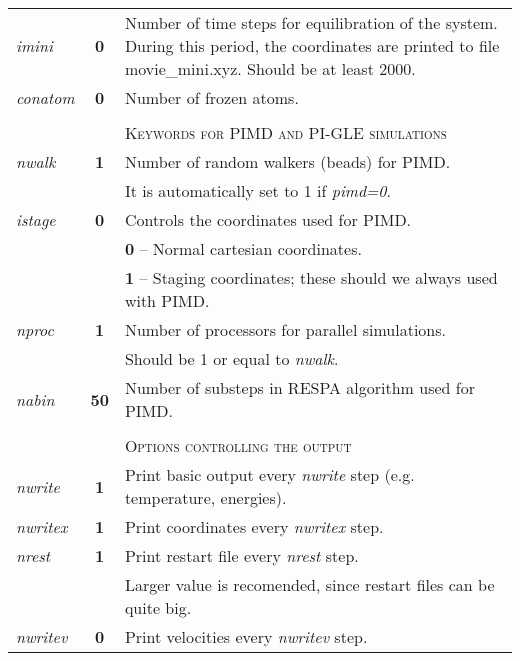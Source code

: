 \documentclass[12pt,a4paper]{article}
\begin{document}
\begin{tabular}{lcl}
\textit{imini} & \textbf{0} &  Number of time steps for equilibration of the system. 
During this period, the coordinates are printed to file movie\_mini.xyz. Should be at least 2000. \\

\textit{conatom} & \textbf{0} & Number of frozen atoms. \\ 
& & \\
& & \textsc{Keywords for PIMD and PI-GLE simulations} \\
\textit{nwalk} & \textbf{1} & Number of random walkers (beads) for PIMD. \\
 & & It is automatically set to 1 if \textit{pimd=0}. \\
 
\textit{istage}  & \textbf{0} & Controls the coordinates used for PIMD.\\
 & & \textbf{0} -- Normal cartesian coordinates.  \\
 & & \textbf{1} -- Staging coordinates; these should we always used with PIMD. \\
\textit{nproc} & \textbf{1} & Number of processors for parallel simulations. \\
& & Should be 1 or equal to \textit{nwalk}. 	 \\
\colorbox{black!20}{\textit{nabin}} & \textbf{50} & Number of substeps in RESPA algorithm used for PIMD. \\
 
& & \\
& & \textsc{Options controlling the output} \\
\textit{nwrite} & \textbf{1}  & Print basic output every \textit{nwrite} step (e.g. temperature, energies).  \\
\textit{nwritex}& \textbf{1}  & Print coordinates every  \textit{nwritex} step. \\
\textit{nrest} & \textbf{1}   & Print restart file every \textit{nrest} step.   \\
& &  Larger value is recomended, since restart files can be quite big. \\
\textit{nwritev} & \textbf{0} & Print velocities every \textit{nwritev} step.   \\

\end{tabular}
\newpage
\end{document}

